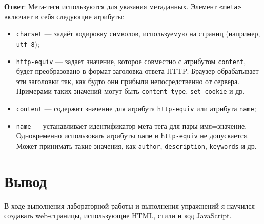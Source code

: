 \documentclass[a4paper, 14pt]{extarticle}
\begin{document}
\begin{enumerate}[leftmargin=*]
        \textbf{Ответ}: Мета-теги используются для указания метаданных. Элемент
        \texttt{<meta>} включает в себя следующие атрибуты:
        \begin{itemize}
          \item \texttt{charset} --- задаёт кодировку символов, используемую на
                страниц (например, \texttt{utf-8});
          \item \texttt{http-equiv} --- задает значение, которое совместно с
                атрибутом \texttt{content}, будет преобразовано в формат
                заголовка ответа HTTP. Браузер обрабатывает эти заголовки так,
                как будто они прибыли непосредственно от сервера. Примерами
                таких значений могут быть \texttt{content-type},
                \texttt{set-cookie} и др.
          \item \texttt{content} --- содержит значение для атрибута
                \texttt{http-equiv} или атрибута \texttt{name};
          \item \texttt{name} --- устанавливает идентификатор мета-тега для
                пары имя=значение. Одновременно использовать атрибуты \texttt{name}
                и \texttt{http-equiv} не допускается. Может принимать такие
                значения, как \texttt{author}, \texttt{description},
                \texttt{keywords} и др.
        \end{itemize}
\end{enumerate}


\section{Вывод}

В ходе выполнения лабораторной работы и выполнения упражнений я научился
создавать web-страницы, использующие HTML, стили и код JavaScript.
\end{document}
